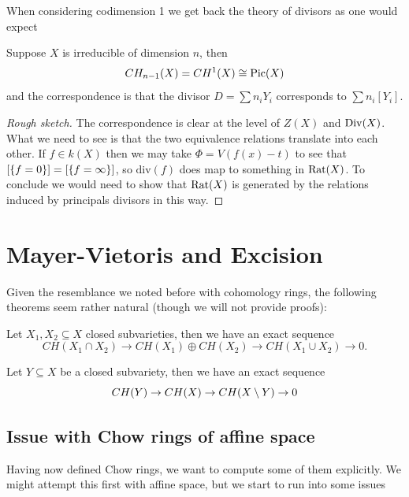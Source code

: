 \noindent
When considering codimension 1 we get back the theory of divisors as one would expect
\begin{proposition}
Suppose $X$ is irreducible of dimension $n$, then
\[CH_{n-1}(X)=CH^1(X)\cong \operatorname{Pic}(X)\]
and the correspondence is that the divisor $D=\sum n_i Y_i$ corresponds to $\sum n_i[Y_i]$.
\end{proposition}
\begin{proof}[Rough sketch]
The correspondence is clear at the level of $Z(X)$ and $\operatorname{Div}(X)$. What we need to see is that the two equivalence relations translate into each other.
If $f\in k(X)$ then we may take $\Phi=V(f(x)-t)$ to see that $[\left\{{f=0}\right\}]=[\left\{{f=\infty}\right\}]$, so $\mathrm{div}(f)$ does map to something in $\mathrm{Rat}(X)$.
To conclude we would need to show that $\mathrm{Rat}(X)$ is generated by the relations induced by principals divisors in this way.
\end{proof}


\section{Mayer-Vietoris and Excision}

Given the resemblance we noted before with cohomology rings, the following theorems seem rather natural (though we will not provide proofs):

\begin{theorem}
Let $X_1,X_2\subseteq X$ closed subvarieties, then we have an exact sequence
\[CH(X_1\cap X_2)\to CH(X_1)\oplus CH(X_2)\to CH(X_1\cup X_2)\to 0.\]
\end{theorem}


\begin{theorem}[Excision]
Let $Y\subseteq X$ be a closed subvariety, then we have an exact sequence
\[CH(Y)\to CH(X)\to CH(X\setminus Y)\to 0\]
\end{theorem}




\subsection{Issue with Chow rings of affine space}

Having now defined Chow rings, we want to compute some of them explicitly. We might attempt this first with affine space, but we start to run into some issues


